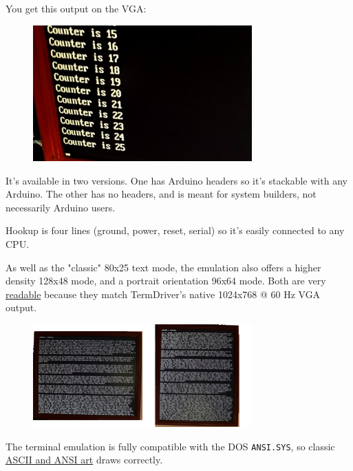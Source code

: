 \documentclass{article}
\begin{document}
You get this output on the VGA:

\begin{figure}[h!]
  \centering
  \includegraphics[width=0.75\textwidth]{img/img3}
\end{figure}

It's available in two versions. One has Arduino headers so it's
stackable with any Arduino. The other has no headers, and is meant for
system builders, not necessarily Arduino users.

Hookup is four lines (ground, power, reset, serial) so it's easily
connected to any CPU.

As well as the "classic" 80x25 text mode, the emulation also offers a
higher density 128x48 mode, and a portrait orientation 96x64 mode. Both
are very \href{http://excamera.com/files/DSC_8931.jpg}{readable} because
they match TermDriver's native 1024x768 @ 60 Hz VGA output.

\begin{figure}[h!]
  \centering
  \includegraphics[width=0.75\textwidth]{img/img4}
\end{figure}

The terminal emulation is fully compatible with the DOS
\texttt{ANSI.SYS}, so classic
\href{http://artscene.textfiles.com/ansi/}{ASCII and ANSI art} draws
correctly.
\end{document}
